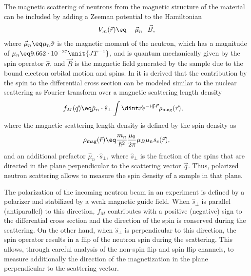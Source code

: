 \documentclass[\main/dresen_thesis.tex]{subfiles}
\begin{document}
    The magnetic scattering of neutrons from the magnetic structure of the material can be included by adding a Zeeman potential to the Hamiltonian
    \begin{align}
      V_m (\vec{r}) \eq - \vec{\mu}_n \cdot \vec{B},
    \end{align}
    where $\vec{\mu}_n \eq \mu_n \hat{\sigma}$ is the magnetic moment of the neutron, which has a magnitude of $\mu_n \eq 9.662 \cdot 10^{-27} \unit{JT^{-1}}$, and is quantum mechanically given by the spin operator $\hat{\sigma}$, and $\vec{B}$ is the magnetic field generated by the sample due to the bound electron orbital motion and spins.
    In  it is derived that the contribution by the spin to the differential cross section can be modeled similar to the nuclear scattering as Fourier transform over a magnetic scattering length density
    \begin{align}
      f_M (\vec{q}) \eq & \hat{\mu}_n \cdot \hat{s}_\perp \int \dint \vec{r} e^{- i \vec{q} \cdot \vec{r}} \rho_\mathrm{mag}(\vec{r}),
    \end{align}
    where the magnetic scattering length density is defined by the spin density as
    \begin{align}
      \rho_\mathrm{mag} (\vec{r}) \eq \frac{m_n}{\hbar^2}  \frac{\mu_0}{2\pi} \mu_B \mu_n s_e (\vec{r}),
      \label{eq:theoreticalBackground:scattering:magneticSLD}
    \end{align}
    and an additional prefactor $\hat{\mu}_n \cdot \hat{s}_\perp$, where $\hat{s}_\perp$ is the fraction of the spins that are directed in the plane perpendicular to the scattering vector $\vec{q}$.
    Thus, polarized neutron scattering allows to measure the spin density of a sample in that plane.

    The polarization of the incoming neutron beam in an experiment is defined by a polarizer and stabilized by a weak magnetic guide field.
    When $\hat{s}_\perp$ is parallel (antiparallel) to this direction, $f_M$ contributes with a positive (negative) sign to the differential cross section and the direction of the spin is conserved during the scattering.
    On the other hand, when $\hat{s}_\perp$ is perpendicular to this direction, the spin operator results in a flip of the neutron spin during the scattering.
    This allows, through careful analysis of the non-spin flip and spin flip channels, to measure additionally the direction of the magnetization in the plane perpendicular to the scattering vector.
\end{document}
